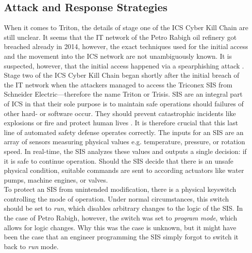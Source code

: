 \documentclass[runningheads]{llncs}
\begin{document}
\subsection{Attack and Response Strategies}
\label{subsection:triton-attack-response}
When it comes to Triton, the details of stage one of the ICS Cyber Kill Chain are still unclear.
It seems that the IT network of the Petro Rabigh oil refinery got breached already in 2014, however, the exact techniques used for the initial access and the movement into the ICS network are not unambiguously known.
It is suspected, however, that the initial access happened via a spearphishing attack \cite{nohe.19}.
\\
Stage two of the ICS Cyber Kill Chain began shortly after the initial breach of the IT network when the attackers managed to access the Triconex SIS from Schneider Electric---therefore the name Triton or Trisis.
SIS are an integral part of ICS in that their sole purpose is to maintain safe operations should failures of other hard- or software occur.
They should prevent catastrophic incidents like explosions or fire and protect human lives \cite{pinto.18}.
It is therefore crucial that this last line of automated safety defense operates correctly.
The inputs for an SIS are an array of sensors measuring physical values e.g. temperature, pressure, or rotation speed.
In real-time, the SIS analyzes these values and outputs a single decision: if it is safe to continue operation.
Should the SIS decide that there is an unsafe physical condition, suitable commands are sent to according actuators like water pumps, machine engines, or valves. \cite{dragos.17}\\
To protect an SIS from unintended modification, there is a physical keyswitch controlling the mode of operation.
Under normal circumstances, this switch should be set to \textit{run}, which disables arbitrary changes to the logic of the SIS.
In the case of Petro Rabigh, however, the switch was set to \textit{program mode}, which allows for logic changes.
Why this was the case is unknown, but it might have been the case that an engineer programming the SIS simply forgot to switch it back to \textit{run} mode.
\end{document}
